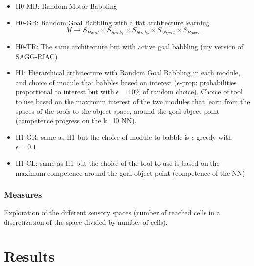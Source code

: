 \documentclass[10pt,letterpaper]{article}
\begin{document}
			\begin{itemize}
			
				\item H0-MB: Random Motor Babbling
				\item H0-GB: Random Goal Babbling with a flat architecture learning $$M \rightarrow S_{Hand} \times S_{Stick_1} \times S_{Stick_2} \times S_{Object} \times S_{Boxes}$$
				\item H0-TR: The same architecture but with active goal babbling (my version of SAGG-RIAC)
				\item H1: Hierarchical architecture with Random Goal Babbling in each module, and choice of module that babbles based on interest ($\epsilon$-prop: probabilities proportional to interest but with $\epsilon=10\%$ of random choice). Choice of tool to use based on the maximum interest of the two modules that learn from the spaces of the tools to the object space, around the goal object point (competence progress on the k=10 NN).
				\item H1-GR: same as H1 but the choice of module to babble is $\epsilon$-greedy with $\epsilon=0.1$
				\item H1-CL: same as H1 but the choice of the tool to use is based on the maximum competence around the goal object point (competence of the NN)
			
			\end{itemize}
				
		
		\subsubsection{Measures}
			
			Exploration of the different sensory spaces (number of reached cells in a discretization of the space divided by number of cells).
			
		
	
%


\section{Results}
	
\end{document}
